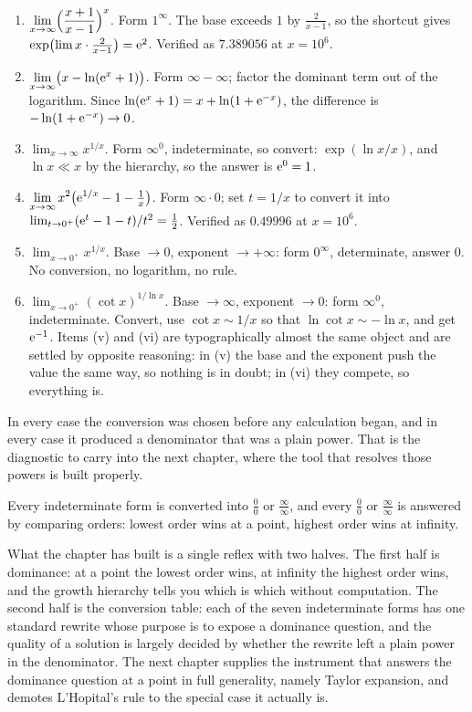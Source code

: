 \begin{enumerate}[label=(\roman*)]
\item $\displaystyle\lim_{x\to\infty}\Bigl(\frac{x+1}{x-1}\Bigr)^{x}$. Form $1^{\infty}$. The base exceeds $1$ by $\frac{2}{x-1}$, so the shortcut gives $\exp\bigl(\lim x\cdot\tfrac{2}{x-1}\bigr)=\mathrm{e}^{2}$. Verified as $7.389056$ at $x=10^{6}$.
\item $\displaystyle\lim_{x\to\infty}\bigl(x-\ln(\mathrm{e}^{x}+1)\bigr)$. Form $\infty-\infty$; factor the dominant term out of the logarithm. Since $\ln(\mathrm{e}^{x}+1)=x+\ln(1+\mathrm{e}^{-x})$, the difference is $-\ln(1+\mathrm{e}^{-x})\to0$.
\item $\displaystyle\lim_{x\to\infty}x^{1/x}$. Form $\infty^{0}$, indeterminate, so convert: $\exp(\ln x/x)$, and $\ln x\ll x$ by the hierarchy, so the answer is $\mathrm{e}^{0}=1$.
\item $\displaystyle\lim_{x\to\infty}x^{2}\bigl(\mathrm{e}^{1/x}-1-\tfrac1x\bigr)$. Form $\infty\cdot0$; set $t=1/x$ to convert it into $\lim_{t\to0^{+}}(\mathrm{e}^{t}-1-t)/t^{2}=\tfrac12$. Verified as $0.49996$ at $x=10^{6}$.
\item $\displaystyle\lim_{x\to0^{+}}x^{1/x}$. Base $\to0$, exponent $\to+\infty$: form $0^{\infty}$, determinate, answer $0$. No conversion, no logarithm, no rule.
\item $\displaystyle\lim_{x\to0^{+}}(\cot x)^{1/\ln x}$. Base $\to\infty$, exponent $\to0$: form $\infty^{0}$, indeterminate. Convert, use $\cot x\sim1/x$ so that $\ln\cot x\sim-\ln x$, and get $\mathrm{e}^{-1}$. Items (v) and (vi) are typographically almost the same object and are settled by opposite reasoning: in (v) the base and the exponent push the value the same way, so nothing is in doubt; in (vi) they compete, so everything is.
\end{enumerate}

In every case the conversion was chosen before any calculation began, and in every case it produced a denominator that was a plain power. That is the diagnostic to carry into the next chapter, where the tool that resolves those powers is built properly.

\begin{keynote}
Every indeterminate form is converted into $\tfrac00$ or $\tfrac{\infty}{\infty}$, and every $\tfrac00$ or $\tfrac{\infty}{\infty}$ is answered by comparing orders: lowest order wins at a point, highest order wins at infinity.
\end{keynote}

What the chapter has built is a single reflex with two halves. The first half is dominance: at a point the lowest order wins, at infinity the highest order wins, and the growth hierarchy tells you which is which without computation. The second half is the conversion table: each of the seven indeterminate forms has one standard rewrite whose purpose is to expose a dominance question, and the quality of a solution is largely decided by whether the rewrite left a plain power in the denominator. The next chapter supplies the instrument that answers the dominance question at a point in full generality, namely Taylor expansion, and demotes L'Hopital's rule to the special case it actually is.

